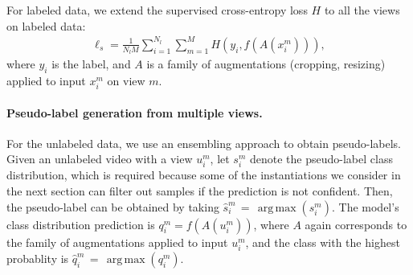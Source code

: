 \documentclass[10pt,twocolumn,letterpaper]{article}
\DeclareMathOperator*{\argmax}{arg\,max}
\begin{document}
For labeled data,
we extend the supervised cross-entropy loss $H$ to all the views on labeled data:
\begin{align}
	\label{eq:sup_loss}
	\ell_s = \frac{1}{N_l M}\sum_{i=1}^{N_l} \sum_{m=1}^{M} H(y_i,f(A(x_i^m))),
\end{align}
where $y_i$ is the label, and $A$ is a family of augmentations (\eg cropping, resizing) applied to input $x_i^m$ on view $m$.

\paragraph{Pseudo-label generation from multiple views.} 
For the unlabeled data, we use an ensembling approach to obtain pseudo-labels. 
Given an unlabeled video with a view $u_i^m$, let $s_i^m$ denote the pseudo-label class distribution, which is required because some of the instantiations we consider in the next section can filter out samples if the prediction is not confident. Then, the pseudo-label can be obtained by taking $\hat{s}_i^m\,{=}\,\argmax(s_i^m)$.
The model's class distribution prediction is $q_i^m = f(A(u_i^m))$, where $A$ again corresponds to the family of augmentations applied to input $u_i^m$, and the class with the highest probablity is $\hat{q}_i^m\,{=}\,\argmax(q_i^m)$. 
\end{document}
